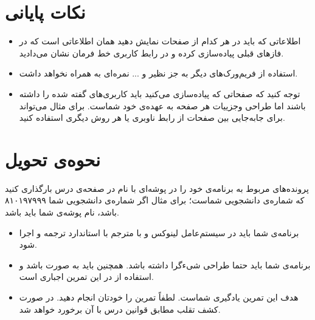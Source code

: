 \documentclass{utap}
\begin{document}
 
 
 
	\section{نکات پایانی}
		\begin{itemize}
			\item  اطلاعاتی که باید در هر کدام از صفحات نمایش دهید همان اطلاعاتی است که در فاز‌های قبلی پیاده‌سازی کرده‌ و در رابط کاربری خط فرمان نشان می‌دادید. 
			\item  
			استفاده از فریم‌ورک‌های دیگر به جز
				نظیر 
				و ... نمره‌ای به همراه نخواهد داشت.
				
			\item 
			توجه کنید که صفحاتی که پیادەسازی می‌کنید باید کاربری‌های گفته شده را داشته باشند اما طراحی وجزییات هر صفحه به عهدەی خود شماست. برای مثال می‌تواند برای جابه‌جایی بین صفحات از رابط ناوبری
			یا هر روش دیگری استفاده کنید. 
		\end{itemize}

	\section{نحوه‌ی تحویل}
		پرونده‌‌های مربوط به برنامه‌ی خود را در پوشه‌ای با نام  در صفحه‌ی  درس بارگذاری کنید که  شماره‌ی دانشجویی شماست؛ برای مثال اگر شماره‌ی دانشجویی شما ۸۱۰۱۹۷۹۹۹ باشد، نام پوشه‌ی شما باید  باشد.
		\begin{itemize}
			\item
						برنامه‌ی شما باید در سیستم‌عامل لینوکس و با مترجم  با استاندارد  ترجمه و اجرا شود.
					\item
						برنامه‌ی شما باید حتما طراحی شیءگرا داشته باشد. همچنین باید به صورت  باشد و استفاده از  در این تمرین اجباری است.
					\item
						هدف این تمرین یادگیری شماست. لطفاً تمرین را خودتان انجام دهید. در صورت کشف تقلب مطابق قوانین درس با آن برخورد خواهد شد.
		\end{itemize}
\end{document}
